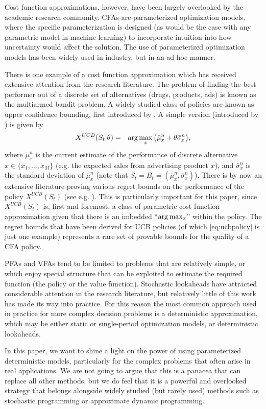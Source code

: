 \documentclass[11pt,oneside,fleqn,reqno,titlepage]{article}
\newcommand{\bn}{\begin{eqnarray}}
\newcommand{\en}{\end{eqnarray}}
\newcounter{example}
\newcommand{\argmax}{{\rm arg}\max}
\def \mubar{\bar \mu}
\def \sigmabar{\bar \sigma}
\begin{document}
Cost function approximations, however, have been largely overlooked by the academic research community.  CFAs are parameterized optimization models, where the specific parameterization is designed (as would be the case with any parametric model in machine learning) to incorporate intuition into how uncertainty would affect the solution.  The use of parameterized optimization models has been widely used in industry, but in an ad hoc manner.

There is one example of a cost function approximation which has received extensive attention from the research literature.  The problem of finding the best performer out of a discrete set of alternatives (drugs, products, ads) is known as the multiarmed bandit problem.  A widely studied class of policies are known as upper confidence bounding, first introduced by \cite{Lai1985}.  A simple version (introduced by \cite{Ka93}) is given by
\bn
X^{UCB}(S_t|\theta) &=& \argmax_{x} \big(\mubar^n_x + \theta \sigmabar^n_x\big), \label{eq:ucbpolicy}
\en
where $\mubar^n_x$ is the current estimate of the performance of discrete alternative $x\in\{x_1, \ldots, x_M\}$ (e.g. the expected sales from advertising product $x$), and $\sigmabar^n_x$ is the standard deviation of $\mubar^n_x$ (note that $S_t = B_t = (\mubar^n_x, \sigmabar^n_x)$).  There is by now an extensive literature proving various regret bounds on the performance of the policy $X^{UCB}(S_t)$ (see e.g. \cite{Bubeck2012}).  This is particularly important for this paper, since $X^{UCB}(S_t)$ is, first and foremost, a class of parametric cost function approximation given that there is an imbedded ``$\argmax_x$'' within the policy.  The regret bounds that have been derived for UCB policies (of which \eqref{eq:ucbpolicy} is just one example) represents a rare set of provable bounds for the quality of a CFA policy.

PFAs and VFAs tend to be limited to problems that are relatively simple, or which enjoy special structure that can be exploited to estimate the required function (the policy or the value function).  Stochastic lookaheads have attracted considerable attention in the research literature, but relatively little of this work has made its way into practice. For this reason the most common approach used in practice for more complex decision problems is a deterministic approximation, which may be either static or single-period optimization models, or deterministic lookaheads.

In this paper, we want to shine a light on the power of using parameterized deterministic models, particularly for the complex problems that often arise in real applications.  We are not going to argue that this is a panacea that can replace all other methods, but we do feel that it is a powerful and overlooked strategy that belongs alongside widely studied (but rarely used) methods such as stochastic programming or approximate dynamic programming.
\end{document}
